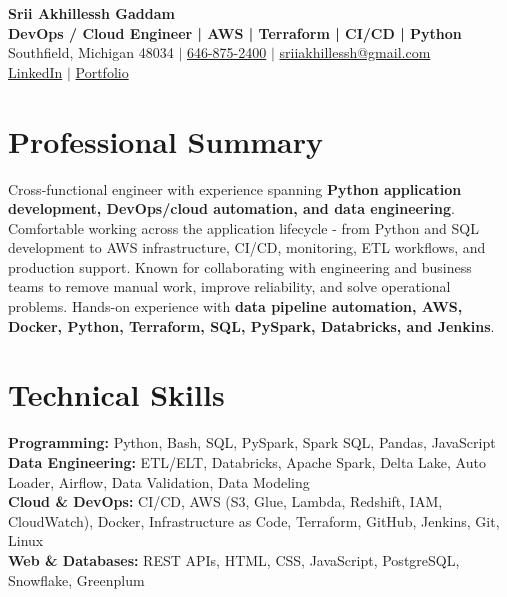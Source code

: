 \documentclass[letterpaper,10pt]{article}
\begin{document}
\fontsize{9.35pt}{10.45pt}\selectfont

\begin{center}
    {\LARGE \textbf{Srii Akhillessh Gaddam}} \\[-1pt]
    \textbf{DevOps / Cloud Engineer | AWS | Terraform | CI/CD | Python} \\[2pt]
    Southfield, Michigan 48034 $|$
    \href{tel:6468752400}{646-875-2400} $|$
    \href{mailto:sriiakhillessh@gmail.com}{sriiakhillessh@gmail.com} \\[1pt]
    \href{https://www.linkedin.com/in/srii-akhiilessh-gaddam-b48668191/}{LinkedIn} $|$
    \href{https://sriiakhillesshg.github.io/portfolio/}{Portfolio}
\end{center}
\vspace{-8pt}

\section{Professional Summary}
\small{Cross-functional engineer with experience spanning \textbf{Python application development, DevOps/cloud automation, and data engineering}. Comfortable working across the application lifecycle - from Python and SQL development to AWS infrastructure, CI/CD, monitoring, ETL workflows, and production support. Known for collaborating with engineering and business teams to remove manual work, improve reliability, and solve operational problems. Hands-on experience with \textbf{data pipeline automation, AWS, Docker, Python, Terraform, SQL, PySpark, Databricks, and Jenkins}.}

\section{Technical Skills}
\small{
\textbf{Programming:} Python, Bash, SQL, PySpark, Spark SQL, Pandas, JavaScript \\
\textbf{Data Engineering:} ETL/ELT, Databricks, Apache Spark, Delta Lake, Auto Loader, Airflow, Data Validation, Data Modeling \\
\textbf{Cloud \& DevOps:} CI/CD, AWS (S3, Glue, Lambda, Redshift, IAM, CloudWatch), Docker, Infrastructure as Code, Terraform, GitHub, Jenkins, Git, Linux \\
\textbf{Web \& Databases:} REST APIs, HTML, CSS, JavaScript, PostgreSQL, Snowflake, Greenplum
}
\end{document}
